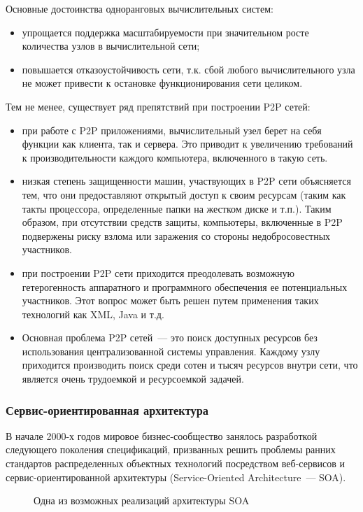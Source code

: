 Основные достоинства одноранговых вычислительных систем:
\begin{itemize}
\item упрощается поддержка масштабируемости при значительном росте количества узлов в вычислительной сети; 
\item повышается отказоустойчивость сети, т.к. сбой любого вычислительного узла не может привести к остановке функционирования сети целиком.
\end{itemize}

Тем не менее, существует ряд препятствий при построении P2P сетей:
\begin{itemize}
\item при работе с P2P приложениями, вычислительный узел берет на себя функции как клиента, так и сервера. Это приводит к увеличению требований к производительности каждого компьютера, включенного в такую сеть.
\item низкая степень защищенности машин, участвующих в P2P сети объясняется тем, что они предоставляют открытый доступ к своим ресурсам (таким как такты процессора, определенные папки на жестком диске и т.п.). Таким образом, при отсутствии средств защиты, компьютеры, включенные в P2P подвержены риску взлома или заражения со стороны недобросовестных участников. 
\item при построении P2P сети приходится преодолевать возможную гетерогенность аппаратного и программного обеспечения ее потенциальных участников. Этот вопрос может быть решен путем применения таких технологий как XML, Java и т.д.
\item Основная проблема P2P сетей~--- это поиск доступных ресурсов без использования централизованной системы управления. Каждому узлу приходится производить поиск среди сотен и тысяч ресурсов внутри сети, что является очень трудоемкой и ресурсоемкой задачей.
\end{itemize}

\subsubsection{Сервис-ориентированная архитектура}
В начале 2000-х годов мировое бизнес-сообщество занялось разработкой следующего поколения спецификаций, призванных решить проблемы ранних стандартов распределенных объектных технологий посредством веб-сервисов и сервис-ориентированной архитектуры (Service-Oriented Architecture~--- SOA).

\begin{figure}[h]
\caption{Одна из возможных реализаций архитектуры SOA}
\label{0:soa}
\end{figure}

